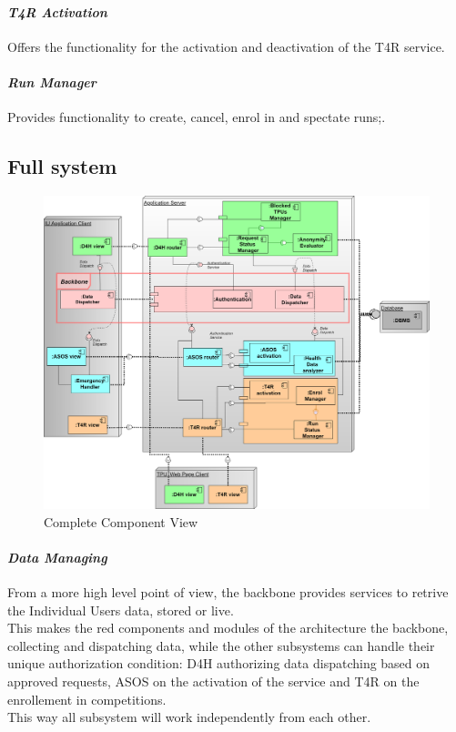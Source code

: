 \paragraph{\textit{T4R Activation}} Offers the functionality for the activation and deactivation of the T4R service.
\paragraph{\textit{Run Manager}} Provides functionality to create, cancel, enrol in and spectate runs;.
\clearpage
\subsection{Full system}
\begin{figure}[H]
\caption{Complete Component View}
\centering
\includegraphics[width = \textwidth]{sections/architecturalDesign/ComponentDiagram.png}
\end{figure}
\paragraph{\textit{Data Managing}} From a more high level point of view, the backbone provides services to retrive the Individual Users data, stored or live. \\
This makes the red components and modules of the architecture the backbone, collecting and dispatching data, while the other subsystems can handle their unique authorization condition: D4H authorizing data dispatching based on approved requests, ASOS on the activation of the service and T4R on the enrollement in competitions. \\
This way all subsystem will work independently from each other.
